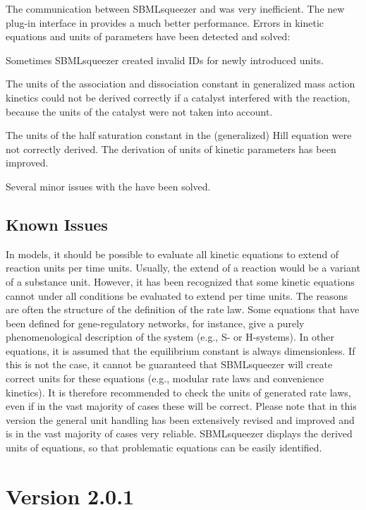 The communication between SBMLsqueezer and \CellDesigner was very inefficient.
The new plug-in interface in \JSBML provides a much better performance.
Errors in kinetic equations and units of parameters have been detected and
solved:
\begin{dinglist}{54}
\item Sometimes SBMLsqueezer created invalid \acp{ID} for newly introduced
      units.
\item The units of the association and dissociation constant in generalized mass
      action kinetics could not be derived correctly if a catalyst interfered
      with the reaction, because the units of the catalyst were not taken into
      account.
\item The units of the half saturation constant in the (generalized) Hill
      equation were not correctly derived. The derivation of units of kinetic
      parameters has been improved.
\end{dinglist}  
Several minor issues with the \GUI have been solved.

\subsection{Known Issues}

In \SBML models, it should be possible to evaluate all kinetic equations to
extend of reaction units per time units. Usually, the extend of a reaction would
be a variant of a substance unit. However, it has been recognized that some
kinetic equations cannot under all conditions be evaluated to extend per time
units. The reasons are often the structure of the definition of the rate law.
Some equations that have been defined for gene-regulatory networks, for
instance, give a purely phenomenological description of the system (e.g.,
S- or H-systems). In other equations, it is assumed that the equilibrium constant
is always dimensionless. If this is not the case, it cannot be guaranteed that
SBMLsqueezer will create correct units for these equations (e.g., modular rate
laws and convenience kinetics). It is therefore recommended to check the units
of generated rate laws, even if in the vast majority of cases these will be
correct. Please note that in this version the general unit handling has been
extensively revised and improved and is in the vast majority of cases very
reliable. SBMLsqueezer displays the derived units of equations, so that
problematic equations can be easily identified.

\section{Version 2.0.1}

